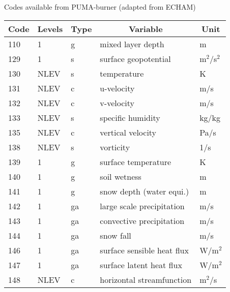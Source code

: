 %

\begin{center}
Codes available from PUMA-burner (adapted from ECHAM) \\

\begin{tabular}[t]{|l|l|l|l|l|} \hline
\multicolumn{1}{|c|}{Code} &
\multicolumn{1}{c|}{Levels}&
\multicolumn{1}{c|}{Type} &
\multicolumn{1}{c|}{Variable} &
\multicolumn{1}{c|}{Unit} \\ \hline \hline

110 & 1    & g  & mixed layer depth                & m               \\ \hline
129 & 1    & s  & surface geopotential             & m$^{2}$/s$^{2}$ \\ \hline
130 & NLEV & s  & temperature                      & K               \\ \hline
131 & NLEV & c  & u-velocity                       & m/s             \\ \hline
132 & NLEV & c  & v-velocity                       & m/s             \\ \hline
133 & NLEV & s  & specific humidity                & kg/kg           \\ \hline
135 & NLEV & c  & vertical velocity                & Pa/s            \\ \hline
138 & NLEV & s  & vorticity                        & 1/s             \\ \hline
139 & 1    & g  & surface temperature              & K               \\ \hline
140 & 1    & g  & soil wetness                     & m               \\ \hline
141 & 1    & g  & snow depth (water equi.)         & m               \\ \hline
142 & 1    & ga & large scale precipitation        & m/s             \\ \hline
143 & 1    & ga & convective precipitation         & m/s             \\ \hline
144 & 1    & ga & snow fall                        & m/s             \\ \hline
146 & 1    & ga & surface sensible heat flux       & W/m$^{2}$       \\ \hline
147 & 1    & ga & surface latent heat flux         & W/m$^{2}$       \\ \hline
148 & NLEV & c  & horizontal streamfunction        & m$^{2}$/s       \\ \hline

\end{tabular}
\end{center}
